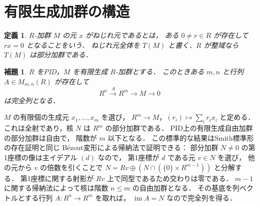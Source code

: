 \documentclass[a5paper,10pt,onecolumn]{jsarticle}
\makeatletter
\theoremstyle{mathnotetheorem}
\newtheorem{definition}[theorem]{定義}
\newtheorem{lemma}[theorem]{補題}
\renewcommand{\proofname}{証明}
\renewenvironment{proof}[1][\proofname]{%
  \par\pushQED{\qed}\normalfont\topsep4\p@\@plus2\p@\relax
  \trivlist\item[\hskip\labelsep\bfseries #1]\ignorespaces
}{\popQED\endtrivlist\@endpefalse}
\makeatother
\begin{document}
\section{有限生成加群の構造}

\begin{definition}
$R$-加群 $M$ の元 $x$ が\emph{ねじれ元}であるとは，
ある $0\ne r\in R$ が存在して $rx=0$ となることをいう．
ねじれ元全体を $T(M)$ と書く．$R$ が整域なら
$T(M)$ は部分加群である．
\end{definition}

\begin{lemma}\label{lem:finite-present}
$R$ をPID，$M$ を有限生成 $R$-加群とする．
このときある $m,n$ と行列 $A\in M_{m,n}(R)$ が存在して
\[
 R^n\xrightarrow{A}R^m\longrightarrow M\longrightarrow0
\]
は完全列となる．
\end{lemma}
\begin{proof}
$M$ の有限個の生成元 $x_1,\dots,x_m$ を選び，
$R^m\to M$，$(r_i)\mapsto\sum_ir_ix_i$ と定める．
これは全射であり，核 $N$ は $R^m$ の部分加群である．
PID上の有限生成自由加群の部分加群は自由で，
階数が $m$ 以下となる．
この標準的な結果はSmith標準形の存在証明と同じ
B\'ezout変形による帰納法で証明できる：
部分加群 $N\ne0$ の第1座標の像は主イデアル $(d)$ なので，
第1座標が $d$ である元 $v\in N$ を選び，
他の元から $v$ の倍数を引くことで
$N=Rv\oplus(N\cap(\{0\}\times R^{m-1}))$ と分解する．
第1座標に関する射影が $Rv$ 上で同型であるため交わりは零である．
$m-1$ に関する帰納法によって核は階数 $n\le m$ の自由加群となる．
その基底を列ベクトルとする行列 $A:R^n\to R^m$ を取れば，
$\operatorname{im}A=N$ なので完全列を得る．
\end{proof}
\end{document}
